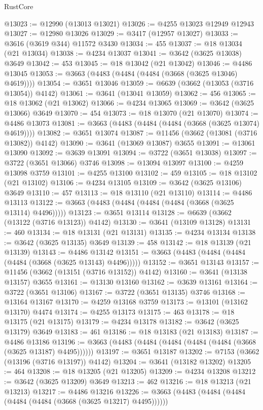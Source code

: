 \begin{lexlean}{RustCore}
\begin{coremodule}
@13023 := @12990 (@13013 @13021)
@13026 := @4255 @13023 @12949 @12943
@13027 := @12980 @13026
@13029 := @3417 (@12957 @13027)
@13033 := @3616 (@3619 @344) @11572 @3430
@13034 := 455
@13037 := @18 @13034 (@21 @13034)
@13038 := @4234 @13037
@13041 := @3642 (@3625 @13038) @3649
@13042 := 453
@13045 := @18 @13042 (@21 @13042)
@13046 := @4486 @13045
@13053 := @3663 (@4483 (@4484 (@4484 (@3668 (@3625 @13046) @4619))))
@13054 := @3651 @13046
@13059 := @6639 (@3662 (@13053 (@3716 @13054)) @4142)
@13061 := @3641 (@13041 @13059)
@13062 := 456
@13065 := @18 @13062 (@21 @13062)
@13066 := @4234 @13065
@13069 := @3642 (@3625 @13066) @3649
@13070 := 454
@13073 := @18 @13070 (@21 @13070)
@13074 := @4486 @13073
@13081 := @3663 (@4483 (@4484 (@4484 (@3668 (@3625 @13074) @4619))))
@13082 := @3651 @13074
@13087 := @11456 (@3662 (@13081 (@3716 @13082)) @4142)
@13090 := @3641 (@13069 @13087) @3655
@13091 := @13061 @13090
@13092 := @3639 @13091
@13094 := @3722 (@3651 @13038)
@13097 := @3722 (@3651 @13066) @3746
@13098 := @13094 @13097
@13100 := @4259 @13098 @3759
@13101 := @4255 @13100
@13102 := 459
@13105 := @18 @13102 (@21 @13102)
@13106 := @4234 @13105
@13109 := @3642 (@3625 @13106) @3649
@13110 := 457
@13113 := @18 @13110 (@21 @13110)
@13114 := @4486 @13113
@13122 := @3663 (@4483 (@4484 (@4484 (@4484 (@3668 (@3625 @13114) @4496)))))
@13123 := @3651 @13114
@13128 := @6639 (@3662 (@13122 (@3716 @13123)) @4142)
@13130 := @3641 (@13109 @13128)
@13131 := 460
@13134 := @18 @13131 (@21 @13131)
@13135 := @4234 @13134
@13138 := @3642 (@3625 @13135) @3649
@13139 := 458
@13142 := @18 @13139 (@21 @13139)
@13143 := @4486 @13142
@13151 := @3663 (@4483 (@4484 (@4484 (@4484 (@3668 (@3625 @13143) @4496)))))
@13152 := @3651 @13143
@13157 := @11456 (@3662 (@13151 (@3716 @13152)) @4142)
@13160 := @3641 (@13138 @13157) @3655
@13161 := @13130 @13160
@13162 := @3639 @13161
@13164 := @3722 (@3651 @13106)
@13167 := @3722 (@3651 @13135) @3746
@13168 := @13164 @13167
@13170 := @4259 @13168 @3759
@13173 := @13101 (@13162 @13170) @4474
@13174 := @4255 @13173
@13175 := 463
@13178 := @18 @13175 (@21 @13175)
@13179 := @4234 @13178
@13182 := @3642 (@3625 @13179) @3649
@13183 := 461
@13186 := @18 @13183 (@21 @13183)
@13187 := @4486 @13186
@13196 := @3663 (@4483 (@4484 (@4484 (@4484 (@4484 (@3668 (@3625 @13187) @4495))))))
@13197 := @3651 @13187
@13202 := @7153 (@3662 (@13196 (@3716 @13197)) @4142)
@13204 := @3641 (@13182 @13202)
@13205 := 464
@13208 := @18 @13205 (@21 @13205)
@13209 := @4234 @13208
@13212 := @3642 (@3625 @13209) @3649
@13213 := 462
@13216 := @18 @13213 (@21 @13213)
@13217 := @4486 @13216
@13226 := @3663 (@4483 (@4484 (@4484 (@4484 (@4484 (@3668 (@3625 @13217) @4495))))))

\end{coremodule}
\end{lexlean}
